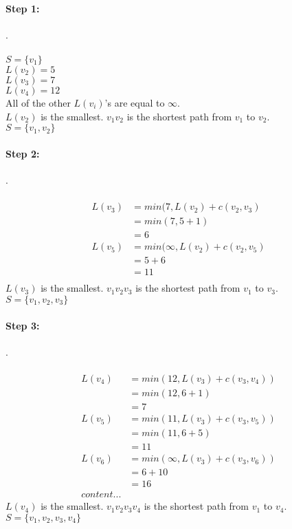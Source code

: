 \documentclass{article}
\begin{document}
	\paragraph{Step 1:}.\\
	\\
	$S = \{v_1\}$\\
	$L(v_2) = 5$\\
	$L(v_3) = 7$\\
	$L(v_4) = 12$\\
	All of the other $L(v_i) $'s are equal to $\infty$.\\
	$L(v_2) $ is the smallest. $v_1v_2$ is the shortest path from $v_1$ to $v_2$.\\
	$S = \{v_1, v_2\}$\\
	
	\paragraph{Step 2:}. \\
	\\
\begin{align*}  
	L(v_3) &= min(7, L(v_2) + c(v_2, v_3) \\  
	&= min(7, 5 + 1)  \\  
	&= 6\\
	L(v_5) &= min(\infty, L(v_2) + c(v_2, v_5) \\  
	&= 5 + 6  \\  
	&= 11\\	
\end{align*}  
	$L(v_3) $ is the smallest. $v_1v_2v_3$ is the shortest path from $v_1$ to $v_3$.\\
$S = \{v_1, v_2, v_3\}$\\

	\paragraph{Step 3:} .\\
	\\
	\begin{align*}
	L(v_4) &= min(12, L(v_3) + c(v_3, v_4)) \\
	&= min(12, 6 + 1)\\
	&= 7\\
	L(v_5) &= min(11, L(v_3) + c(v_3, v_5))\\
	&= min(11, 6 + 5)\\
	&= 11\\
	L(v_6) &= min(\infty, L(v_3) + c(v_3, v_6))\\
	&= 6 + 10\\
	&= 16\\	
		content...
	\end{align*}
		$L(v_4) $ is the smallest. $v_1v_2v_3v_4$ is the shortest path from $v_1$ to $v_4$.\\
	$S = \{v_1, v_2, v_3, v_4\}$\\	
	
\end{document}
